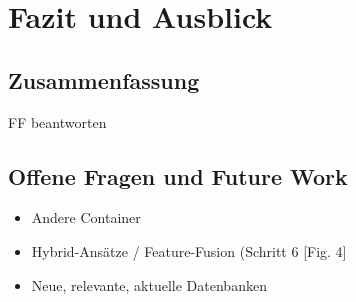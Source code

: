 \chapter{Fazit und Ausblick}


\section{Zusammenfassung}
FF beantworten


\section{Offene Fragen und Future Work}

\begin{itemize}
    \item Andere Container
    \item Hybrid-Ansätze / Feature-Fusion (Schritt 6 [Fig. 4]\cite{yang_comprehensive_2025}
    \item Neue, relevante, aktuelle Datenbanken
\end{itemize}